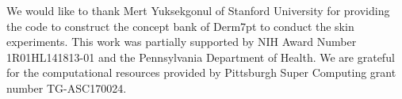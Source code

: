 We would like to thank Mert Yuksekgonul of Stanford University for providing the code to construct the concept bank of Derm7pt to conduct the skin experiments. This work was partially supported by NIH Award Number 1R01HL141813-01 and the Pennsylvania Department of Health. We are grateful for the computational resources provided by Pittsburgh Super Computing grant number TG-ASC170024.

